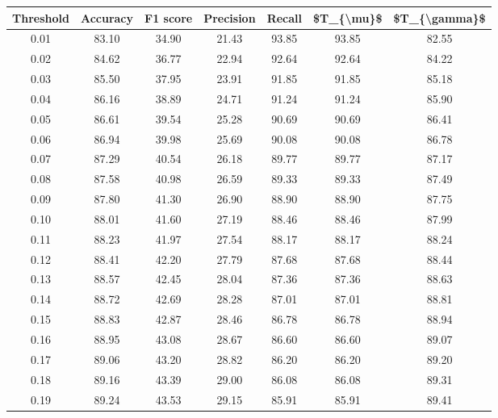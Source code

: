 \begin{tabular}{|c|c|c|c|c|c|c|}
\hline
 Threshold &  Accuracy &  F1 score &  Precision &  Recall &  \$T\_\{\textbackslash mu\}\$ &  \$T\_\{\textbackslash gamma\}\$ \\
\hline
      0.01 &     83.10 &     34.90 &      21.43 &   93.85 &      93.85 &         82.55 \\
      0.02 &     84.62 &     36.77 &      22.94 &   92.64 &      92.64 &         84.22 \\
      0.03 &     85.50 &     37.95 &      23.91 &   91.85 &      91.85 &         85.18 \\
      0.04 &     86.16 &     38.89 &      24.71 &   91.24 &      91.24 &         85.90 \\
      0.05 &     86.61 &     39.54 &      25.28 &   90.69 &      90.69 &         86.41 \\
      0.06 &     86.94 &     39.98 &      25.69 &   90.08 &      90.08 &         86.78 \\
      0.07 &     87.29 &     40.54 &      26.18 &   89.77 &      89.77 &         87.17 \\
      0.08 &     87.58 &     40.98 &      26.59 &   89.33 &      89.33 &         87.49 \\
      0.09 &     87.80 &     41.30 &      26.90 &   88.90 &      88.90 &         87.75 \\
      0.10 &     88.01 &     41.60 &      27.19 &   88.46 &      88.46 &         87.99 \\
      0.11 &     88.23 &     41.97 &      27.54 &   88.17 &      88.17 &         88.24 \\
      0.12 &     88.41 &     42.20 &      27.79 &   87.68 &      87.68 &         88.44 \\
      0.13 &     88.57 &     42.45 &      28.04 &   87.36 &      87.36 &         88.63 \\
      0.14 &     88.72 &     42.69 &      28.28 &   87.01 &      87.01 &         88.81 \\
      0.15 &     88.83 &     42.87 &      28.46 &   86.78 &      86.78 &         88.94 \\
      0.16 &     88.95 &     43.08 &      28.67 &   86.60 &      86.60 &         89.07 \\
      0.17 &     89.06 &     43.20 &      28.82 &   86.20 &      86.20 &         89.20 \\
      0.18 &     89.16 &     43.39 &      29.00 &   86.08 &      86.08 &         89.31 \\
      0.19 &     89.24 &     43.53 &      29.15 &   85.91 &      85.91 &         89.41 \\

\end{tabular}
